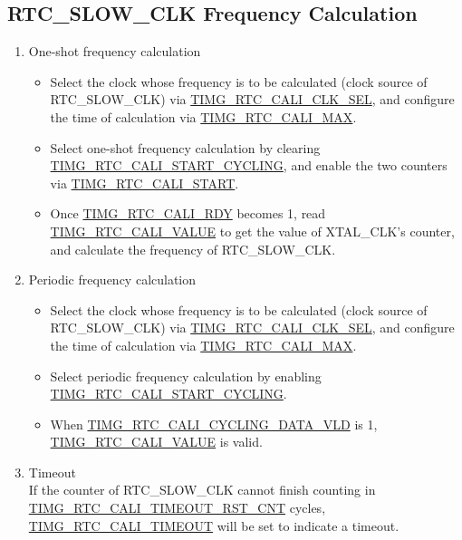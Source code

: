 \documentclass[main\_\_EN.tex]{subfiles}
\begin{document}
\subsection{RTC\_SLOW\_CLK Frequency Calculation}
\begin{enumerate}
    \item One-shot frequency calculation
    \begin{itemize}
        \item Select the clock whose frequency is to be calculated (clock source of RTC\_SLOW\_CLK) via \hyperref[fielddesc:TIMGRTCCALICLKSEL]{TIMG\_RTC\_CALI\_CLK\_SEL}, and configure the time of calculation via \hyperref[fielddesc:TIMGRTCCALIMAX]{TIMG\_RTC\_CALI\_MAX}.
        \item Select one-shot frequency calculation by clearing \hyperref[fielddesc:TIMGRTCCALISTARTCYCLING]{TIMG\_RTC\_CALI\_START\_CYCLING}, and enable the two counters via \hyperref[fielddesc:TIMGRTCCALISTART]{TIMG\_RTC\_CALI\_START}.
        \item Once \hyperref[fielddesc:TIMGRTCCALIRDY]{TIMG\_RTC\_CALI\_RDY} becomes 1, read \hyperref[fielddesc:TIMGRTCCALIVALUE]{TIMG\_RTC\_CALI\_VALUE} to get the value of XTAL\_CLK's counter, and calculate the frequency of  RTC\_SLOW\_CLK.
    \end{itemize}
    \item Periodic frequency calculation
    \begin{itemize}
        \item Select the clock whose frequency is to be calculated (clock source of RTC\_SLOW\_CLK) via \hyperref[fielddesc:TIMGRTCCALICLKSEL]{TIMG\_RTC\_CALI\_CLK\_SEL}, and configure the time of calculation via \hyperref[fielddesc:TIMGRTCCALIMAX]{TIMG\_RTC\_CALI\_MAX}.
        \item Select periodic frequency calculation by enabling \hyperref[fielddesc:TIMGRTCCALISTARTCYCLING]{TIMG\_RTC\_CALI\_START\_CYCLING}.
        \item When \hyperref[fielddesc:TIMGRTCCALICYCLINGDATAVLD]{TIMG\_RTC\_CALI\_CYCLING\_DATA\_VLD} is 1, \hyperref[fielddesc:TIMGRTCCALIVALUE]{TIMG\_RTC\_CALI\_VALUE} is valid.
    \end{itemize}
    \item Timeout\\
    If the counter of RTC\_SLOW\_CLK cannot finish counting in \hyperref[fielddesc:TIMGRTCCALITIMEOUTRSTCNT]{TIMG\_RTC\_CALI\_TIMEOUT\_RST\_CNT} cycles,  \\\hyperref[fielddesc:TIMGRTCCALITIMEOUT]{TIMG\_RTC\_CALI\_TIMEOUT} will be set to indicate a timeout.
\end{enumerate}
\end{document}
